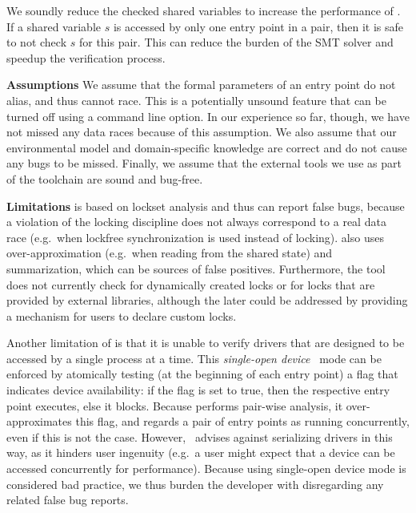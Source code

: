 We soundly reduce the checked shared variables to increase the performance of \whoop. If a shared variable $s$ is accessed by only one entry point in a pair, then it is safe to not check $s$ for this pair. This can reduce the burden of the SMT solver and speedup the verification process.

\medskip\noindent\textbf{Assumptions }
%
We assume that the formal parameters of an entry point do not alias, and thus cannot race. This is a potentially unsound feature that can be turned off using a command line option. In our experience so far, though, we have not missed any data races because of this assumption. We also assume that our environmental model and domain-specific knowledge are correct and do not cause any bugs to be missed. Finally, we assume that the external tools we use as part of the \whoop toolchain are sound and bug-free.

\medskip\noindent\textbf{Limitations }
%
\whoop is based on lockset analysis and thus can report false bugs, because a violation of the locking discipline does not always correspond to a real data race (e.g.\ when lockfree synchronization is used instead of locking). \whoop also uses over-approximation (e.g.\ when reading from the shared state) and summarization, which can be sources of false positives. Furthermore, the tool does not currently check for dynamically created locks or for locks that are provided by external libraries, although the later could be addressed by providing a mechanism for users to declare custom locks.


Another limitation of \whoop is that it is unable to verify drivers that are designed to be accessed by a single process at a time. This \emph{single-open device}~\cite{corbet2005linux} mode can be enforced by atomically testing (at the beginning of each entry point) a flag that indicates device availability: if the flag is set to true, then the respective entry point executes, else it blocks. Because \whoop performs pair-wise analysis, it over-approximates this flag, and regards a pair of entry points as running concurrently, even if this is not the case. However,~\cite{corbet2005linux} advises against serializing drivers in this way, as it hinders user ingenuity (e.g.\ a user might expect that a device can be accessed concurrently for performance). Because using single-open device mode is considered bad practice, we thus burden the developer with disregarding any related false bug reports.

